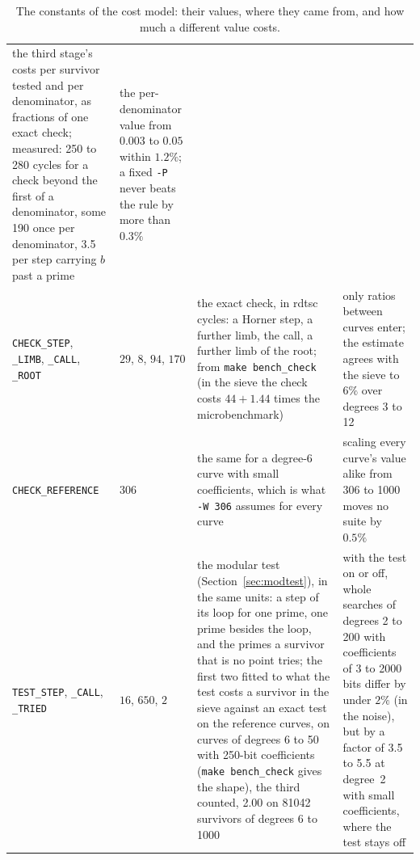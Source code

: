\documentclass[12pt,a4paper,oneside]{amsart}
\begin{document}
\begin{table}[tbp]
\begin{tabular}{@{}P{4.0cm}P{1.7cm}P{5.6cm}P{5.6cm}@{}}
  the third stage's costs per survivor tested and per denominator, as
  fractions of one exact check; measured: 250 to 280 cycles for a check
  beyond the first of a denominator, some 190 once per denominator, 3.5 per
  step carrying $b$ past a prime &
  the per-denominator value from $0.003$ to $0.05$ within $1.2\%$; a fixed
  \verb+-P+ never beats the rule by more than $0.3\%$ \\[3pt]
\texttt{CHECK\_STEP}, \texttt{\_LIMB}, \texttt{\_CALL}, \texttt{\_ROOT} &
  $29$, $8$, $94$, $170$ &
  the exact check, in rdtsc cycles: a Horner step, a further limb, the
  call, a further limb of the root; from \texttt{make bench\_check} (in the
  sieve the check costs $44 + 1.44$ times the microbenchmark) &
  only ratios between curves enter; the estimate agrees with the sieve to
  $6\%$ over degrees 3 to 12 \\[3pt]
\texttt{CHECK\_REFERENCE} & $306$ &
  the same for a degree-6 curve with small coefficients, which is what
  \verb+-W 306+ assumes for every curve &
  scaling every curve's value alike from 306 to 1000 moves no suite by
  $0.5\%$ \\[3pt]
\texttt{TEST\_STEP}, \texttt{\_CALL}, \texttt{\_TRIED} & $16$, $650$, $2$ &
  the modular test (Section~\ref{sec:modtest}), in the same units: a step
  of its loop for one prime, one prime besides the loop, and the primes a
  survivor that is no point tries; the first two fitted to what the test
  costs a survivor in the sieve against an exact test on the reference
  curves, on curves of degrees 6 to 50 with 250-bit coefficients
  (\texttt{make bench\_check} gives the shape), the third counted, 2.00
  on 81042 survivors of degrees 6 to 1000 &
  with the test on or off, whole searches of degrees 2 to 200 with
  coefficients of 3 to 2000 bits differ by under $2\%$ (in the noise),
  but by a factor of 3.5 to 5.5 at degree~2 with small coefficients,
  where the test stays off \\
\end{tabular}
\caption{The constants of the cost model: their values, where they came
from, and how much a different value costs.}\label{tab:constants}
\end{table}
\end{document}
